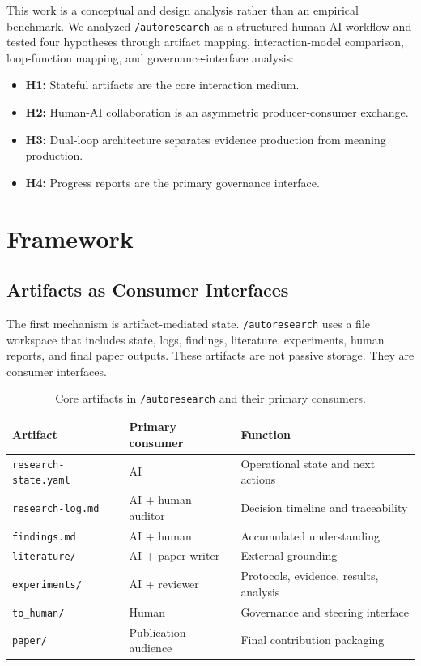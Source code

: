 \documentclass[11pt]{article}
\begin{document}
This work is a conceptual and design analysis rather than an empirical benchmark. We analyzed \texttt{/autoresearch} as a structured human-AI workflow and tested four hypotheses through artifact mapping, interaction-model comparison, loop-function mapping, and governance-interface analysis:

\begin{itemize}[leftmargin=*]
  \item \textbf{H1:} Stateful artifacts are the core interaction medium.
  \item \textbf{H2:} Human-AI collaboration is an asymmetric producer-consumer exchange.
  \item \textbf{H3:} Dual-loop architecture separates evidence production from meaning production.
  \item \textbf{H4:} Progress reports are the primary governance interface.
\end{itemize}

\section{Framework}

\subsection{Artifacts as Consumer Interfaces}

The first mechanism is artifact-mediated state. \texttt{/autoresearch} uses a file workspace that includes state, logs, findings, literature, experiments, human reports, and final paper outputs. These artifacts are not passive storage. They are consumer interfaces.

\begin{table}[h]
\centering
\begin{tabular}{lll}
\toprule
Artifact & Primary consumer & Function \\
\midrule
\texttt{research-state.yaml} & AI & Operational state and next actions \\
\texttt{research-log.md} & AI + human auditor & Decision timeline and traceability \\
\texttt{findings.md} & AI + human & Accumulated understanding \\
\texttt{literature/} & AI + paper writer & External grounding \\
\texttt{experiments/} & AI + reviewer & Protocols, evidence, results, analysis \\
\texttt{to\_human/} & Human & Governance and steering interface \\
\texttt{paper/} & Publication audience & Final contribution packaging \\
\bottomrule
\end{tabular}
\caption{Core artifacts in \texttt{/autoresearch} and their primary consumers.}
\label{tab:artifacts}
\end{table}
\end{document}
